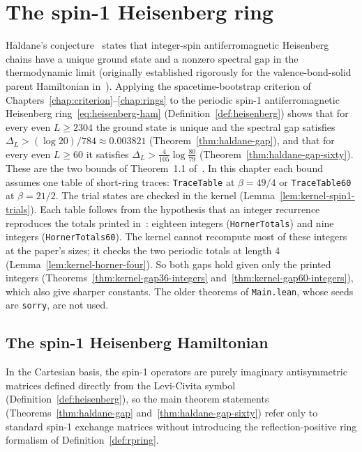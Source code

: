 \chapter{The spin-1 Heisenberg ring}
\label{chap:heisenberg}

Haldane's conjecture~\cite{Haldane1983Continuum, Haldane1983Nonlinear} states that integer-spin
antiferromagnetic Heisenberg chains have a unique ground state and a nonzero spectral gap in the
thermodynamic limit (originally established rigorously for the valence-bond-solid parent
Hamiltonian in~\cite{Affleck1987Rigorous}). Applying the spacetime-bootstrap criterion of
Chapters~\ref{chap:criterion}--\ref{chap:rings} to the periodic spin-1 antiferromagnetic Heisenberg
ring~\eqref{eq:heisenberg-ham} (Definition~\ref{def:heisenberg}) shows that for every even
\(L \ge 2304\) the ground state is unique and the spectral gap satisfies
\(\Delta_L > (\log 20)/784 \approx 0.003821\) (Theorem~\ref{thm:haldane-gap}), and that for every
even \(L \ge 60\) it satisfies \(\Delta_L > \tfrac{4}{105}\log\tfrac{80}{79}\)
(Theorem~\ref{thm:haldane-gap-sixty}). These are the two bounds of Theorem~1.1
of~\cite{OpenAIHaldane}. In this chapter each bound assumes one table of short-ring traces:
\texttt{TraceTable} at \(\beta = 49/4\) or \texttt{TraceTable60} at \(\beta = 21/2\).
The trial states are checked in the kernel (Lemma~\ref{lem:kernel-spin1-trials}).
Each table follows from the hypothesis that an integer recurrence reproduces the totals printed
in~\cite[Appendices A and B]{OpenAIHaldane}: eighteen integers (\texttt{HornerTotals}) and nine
integers (\texttt{HornerTotals60}). The kernel cannot recompute most of these integers at
the paper's sizes; it checks the two periodic totals at length \(4\)
(Lemma~\ref{lem:kernel-horner-four}). So both gaps
hold given only the printed integers (Theorems~\ref{thm:kernel-gap36-integers}
and~\ref{thm:kernel-gap60-integers}), which also give sharper constants. The older theorems of
\texttt{Main.lean}, whose seeds are \texttt{sorry}, are not used.

\section{The spin-1 Heisenberg Hamiltonian}

In the Cartesian basis, the spin-1 operators are purely imaginary antisymmetric matrices defined
directly from the Levi-Civita symbol (Definition~\ref{def:heisenberg}), so the main theorem
statements (Theorems~\ref{thm:haldane-gap} and~\ref{thm:haldane-gap-sixty}) refer only to standard
spin-1 exchange matrices without introducing the reflection-positive ring formalism of
Definition~\ref{def:rpring}.

